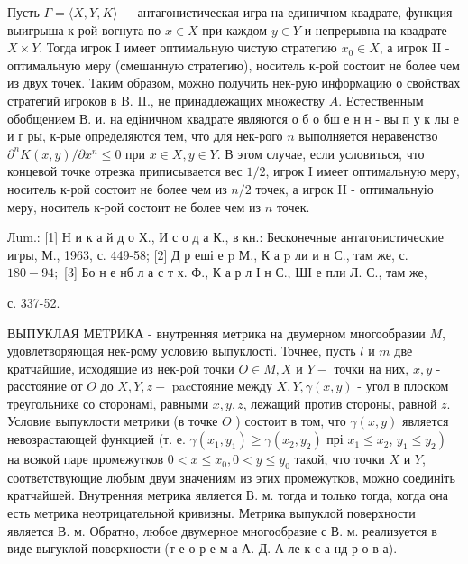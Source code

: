 \documentclass[10pt]{article}
\begin{document}
Пусть $\Gamma=\langle X, Y, K\rangle-$ антагонистическая игра на единичном квадрате, функция выигрыша к-рой вогнута по $x \in X$ при каждом $y \in Y$ и непрерывна на квадрате $X \times Y$. Тогда игрок I имеет оптимальную чистую стратегию $x_{0} \in X$, а игрок II - оптимальную меру (смешанную стратегию), носитель к-рой состоит не более чем из двух точек. Таким образом, можно получить нек-рую информацию о свойствах стратегий игроков в B. II., не принадлежащих множеству $A$. Естественным обобщением В. и. на едіничном квадрате являются о б о бш е н н - вы п у к лы е и г ры, к-рые определяются тем, что для нек-рого $n$ выполняется неравенство $\partial^{n} K(x, y) / \partial x^{n} \leqslant 0$ при $x \in X, y \in Y$. В этом случае, если условиться, что концевой точке отрезка приписывается вес $1 / 2$, игрок I имеет оптимальную меру, носитель к-рой состоит не более чем из $n / 2$ точек, а игрок II - оптимальнуіо меру, носитель к-рой состоит не более чем из $n$ точек.



Лum.: [1] Н и к а й д о Х., И с о д а К., в кн.: Бесконечные антагонистические игры, М., 1963, с. 449-58; [2] Д р еші е $\mathrm{p}$ М., К а $\mathrm{p}$ ли и н С., там же, с. $180-94 ;$ [3] Бо н е нб л а с т х. Ф., К а р л І н С., ШІ е пли Л. С., там же,

с. 337-52.



ВЫПУКЛАЯ МЕТРИКА - внутренняя метрика на двумерном многообразии $M$, удовлетворяющая нек-рому условию выпуклості. Точнее, пусть $l$ и $m$ две кратчайшие, исходящие из нек-рой точки $O \in M, X$ и $Y-$ точки на них, $x, y$ - расстояние от $O$ до $X, Y, z-$ pacстояние между $X, Y, \gamma(x, y)$ - угол в плоском треугольнике со сторонамі, равными $x, y, z$, лежащий против стороны, равной $z$. Условие выпуклости метрики (в точке $O$ ) состоит в том, что $\gamma(x, y)$ является невозрастающей функцией (т. е. $\gamma\left(x_{1}, y_{1}\right) \geqslant \gamma\left(x_{2}, y_{2}\right)$ прі $x_{1} \leqslant x_{2}$, $\left.y_{1} \leqslant y_{2}\right)$ на всякой паре промежутков $0<x \leqslant x_{0}, 0<y \leqslant y_{0}$ такой, что точки $X$ и $Y$, соответствующие любым двум значениям из этих промежутков, можно соединіть кратчайшей. Внутренняя метрика является В. м. тогда и только тогда, когда она есть метрика неотрицательной кривизны. Метрика выпуклой поверхности является В. м. Обратно, любое двумерное многообразие с В. м. реализуется в виде выгуклой поверхности (т е о р е м а А. Д. А ле к с а нд р о в а).
\end{document}
